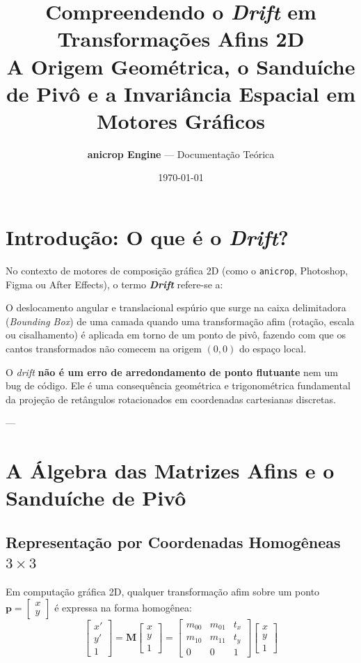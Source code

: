 \documentclass[12pt,a4paper]{article}
\title{\textbf{\huge Compreendendo o \textit{Drift} em Transformações Afins 2D}\\[0.5em]
\large A Origem Geométrica, o Sanduíche de Pivô e a Invariância Espacial em Motores Gráficos}
\author{\textbf{anicrop Engine} — Documentação Teórica}
\date{\today}
\begin{document}
\maketitle
\tableofcontents
\newpage

\section{Introdução: O que é o \textit{Drift}?}

No contexto de motores de composição gráfica 2D (como o \texttt{anicrop}, Photoshop, Figma ou After Effects), o termo \textbf{\textit{Drift}} refere-se a:

\begin{tcolorbox}[title=Definição Formal de \textit{Drift}]
O deslocamento angular e translacional espúrio que surge na caixa delimitadora (\textit{Bounding Box}) de uma camada quando uma transformação afim (rotação, escala ou cisalhamento) é aplicada em torno de um ponto de pivô, fazendo com que os cantos transformados não comecem na origem $(0, 0)$ do espaço local.
\end{tcolorbox}

O \textit{drift} \textbf{não é um erro de arredondamento de ponto flutuante} nem um bug de código. Ele é uma consequência geométrica e trigonométrica fundamental da projeção de retângulos rotacionados em coordenadas cartesianas discretas.

---

\section{A Álgebra das Matrizes Afins e o Sanduíche de Pivô}

\subsection{Representação por Coordenadas Homogêneas $3 \times 3$}

Em computação gráfica 2D, qualquer transformação afim sobre um ponto $\mathbf{p} = \begin{bmatrix} x \\ y \end{bmatrix}$ é expressa na forma homogênea:
\begin{equation}
\begin{bmatrix} x' \\ y' \\ 1 \end{bmatrix} = \mathbf{M} \begin{bmatrix} x \\ y \\ 1 \end{bmatrix} = \begin{bmatrix} m_{00} & m_{01} & t_x \\ m_{10} & m_{11} & t_y \\ 0 & 0 & 1 \end{bmatrix} \begin{bmatrix} x \\ y \\ 1 \end{bmatrix}
\end{equation}
\end{document}

